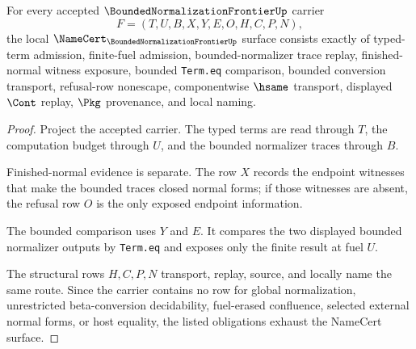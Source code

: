 \begin{theorem}
\label{thm:bounded-normalization-frontier-namecert-obligations}
For every accepted $\BoundedNormalizationFrontierUp$ carrier
$$
F=(T,U,B,X,Y,E,O,H,C,P,N),
$$
the local $\NameCert_{\BoundedNormalizationFrontierUp}$ surface consists exactly of typed-term admission, finite-fuel admission, bounded-normalizer trace replay, finished-normal witness exposure, bounded \texttt{Term.eq} comparison, bounded conversion transport, refusal-row nonescape, componentwise $\hsame$ transport, displayed $\Cont$ replay, $\Pkg$ provenance, and local naming.
\end{theorem}
\begin{proof}
Project the accepted carrier. The typed terms are read through $T$, the computation budget through $U$, and the bounded normalizer traces through $B$.

Finished-normal evidence is separate. The row $X$ records the endpoint witnesses that make the bounded traces closed normal forms; if those witnesses are absent, the refusal row $O$ is the only exposed endpoint information.

The bounded comparison uses $Y$ and $E$. It compares the two displayed bounded normalizer outputs by \texttt{Term.eq} and exposes only the finite result at fuel $U$.

The structural rows $H,C,P,N$ transport, replay, source, and locally name the same route. Since the carrier contains no row for global normalization, unrestricted beta-conversion decidability, fuel-erased confluence, selected external normal forms, or host equality, the listed obligations exhaust the NameCert surface.
\end{proof}

